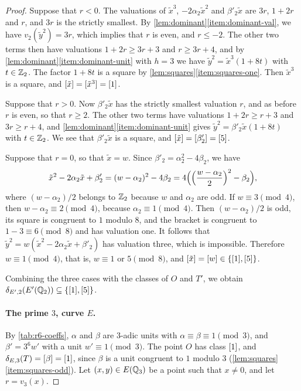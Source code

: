\begin{proof}
Suppose that $r<0$. The valuations of $\tilde x^3$, $-2\alpha_2\tilde x^2$ and $\beta'_2\tilde x$ are $3r$, $1+2r$ and $r$, and $3r$ is the strictly smallest. By \cref{lem:dominant}\ref{item:dominant-val}, we have $v_2(\tilde y^2)=3r$, which implies that $r$ is even, and $r\le-2$. The other two terms then have valuations $1+2r\ge3r+3$ and $r\ge3r+4$, and by \cref{lem:dominant}\ref{item:dominant-unit} with $h=3$ we have $\tilde y^2=\tilde x^3(1+8t)$ with $t\in\mathbb Z_2$. The factor $1+8t$ is a square by \cref{lem:squares}\ref{item:squares-one}. Then $\tilde x^3$ is a square, and $[\tilde x]=[\tilde x^3]=[1]$.

Suppose that $r>0$. Now $\beta'_2\tilde x$ has the strictly smallest valuation $r$, and as before $r$ is even, so that $r\ge2$. The other two terms have valuations $1+2r\ge r+3$ and $3r\ge r+4$, and \cref{lem:dominant}\ref{item:dominant-unit} gives $\tilde y^2=\beta'_2\tilde x(1+8t)$ with $t\in\mathbb Z_2$. We see that $\beta'_2\tilde x$ is a square, and $[\tilde x]=[\beta'_2]=[5]$.

Suppose that $r=0$, so that $\tilde x=w$. Since $\beta'_2=\alpha_2^2-4\beta_2$, we have
\[
\tilde x^2-2\alpha_2\tilde x+\beta'_2=(w-\alpha_2)^2-4\beta_2=4\Bigl(\Bigl(\frac{w-\alpha_2}{2}\Bigr)^2-\beta_2\Bigr),
\]
where $(w-\alpha_2)/2$ belongs to $\mathbb Z_2$ because $w$ and $\alpha_2$ are odd. If $w\equiv3\pmod4$, then $w-\alpha_2\equiv2\pmod 4$, because $\alpha_2\equiv1\pmod4$. Then $(w-\alpha_2)/2$ is odd, its square is congruent to $1$ modulo $8$, and the bracket is congruent to $1-3\equiv6\pmod8$ and has valuation one. It follows that $\tilde y^2=w(\tilde x^2-2\alpha_2\tilde x+\beta'_2)$ has valuation three, which is impossible. Therefore $w\equiv1\pmod4$, that is, $w\equiv1$ or $5\pmod8$, and $[\tilde x]=[w]\in\{[1],[5]\}$.

Combining the three cases with the classes of $O$ and $T'$, we obtain $\delta_{E',2}(E'(\mathbb Q_2))\subseteq\{[1],[5]\}$.

\paragraph{The prime $3$, curve $E$.} By \cref{tab:r6-coeffs}, $\alpha$ and $\beta$ are $3$-adic units with $\alpha\equiv\beta\equiv1\pmod3$, and $\beta'=3^6w'$ with a unit $w'\equiv1\pmod3$. The point $O$ has class $[1]$, and $\delta_{E,3}(T)=[\beta]=[1]$, since $\beta$ is a unit congruent to $1$ modulo $3$ (\cref{lem:squares}\ref{item:squares-odd}). Let $(x,y)\in E(\mathbb Q_3)$ be a point such that $x\ne0$, and let $r=v_3(x)$.


\end{proof}
